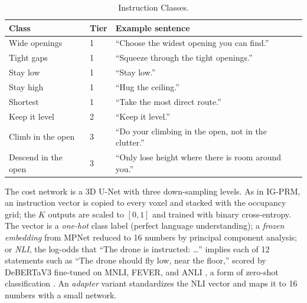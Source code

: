 \documentclass[conference]{IEEEtran}
\begin{document}
\begin{table}[t]
\caption{Instruction Classes.}
\label{tab:classes}
\centering
\footnotesize
\begin{tabular}{@{}llp{4.7cm}@{}}
\toprule
Class & Tier & Example sentence \\
\midrule
Wide openings & 1 & ``Choose the widest opening you can find.'' \\
Tight gaps & 1 & ``Squeeze through the tight openings.'' \\
Stay low & 1 & ``Stay low.'' \\
Stay high & 1 & ``Hug the ceiling.'' \\
Shortest & 1 & ``Take the most direct route.'' \\
Keep it level & 2 & ``Keep it level.'' \\
Climb in the open & 3 & ``Do your climbing in the open, not in the clutter.'' \\
Descend in the open & 3 & ``Only lose height where there is room around you.'' \\
\bottomrule
\end{tabular}
\end{table}

The cost network is a 3D U-Net \cite{ronneberger2015unet,cicek2016unet3d} with three down-sampling levels. As in IG-PRM, an instruction vector is copied to every voxel and stacked with the occupancy grid; the $K$ outputs are scaled to $[0,1]$ and trained with binary cross-entropy. The vector is a \textit{one-hot} class label (perfect language understanding); a \textit{frozen embedding} \cite{reimers2019sbert} from MPNet \cite{song2020mpnet} reduced to 16 numbers by principal component analysis; or \textit{NLI}, the log-odds that ``The drone is instructed: \ldots'' implies each of 12 statements such as ``The drone should fly low, near the floor,'' scored by DeBERTaV3 \cite{he2023debertav3} fine-tuned on MNLI, FEVER, and ANLI \cite{williams2018mnli,thorne2018fever,nie2020anli}, a form of zero-shot classification \cite{yin2019zeroshot}. An \textit{adapter} variant standardizes the NLI vector and maps it to 16 numbers with a small network.
\end{document}
